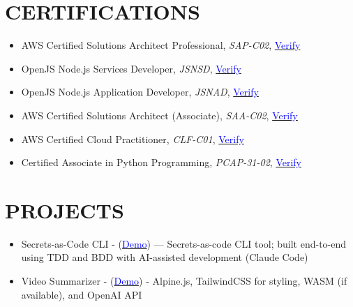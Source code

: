 \documentclass[margin]{res}
\begin{document}
\begin{resume}
	\section{\textcolor{NavyBlue}{CERTIFICATIONS}}
	\begin{itemize} %
		\item AWS Certified Solutions Architect Professional, \textit{SAP-C02},
		      \href{https://www.youracclaim.com/badges/6768bef0-a7c0-42a6-9b36-6e13351250be}{\textcolor{blue}{Verify}}

		\item OpenJS Node.js Services Developer, \textit{JSNSD},
					\href{https://www.youracclaim.com/badges/d17570bd-2145-4cc2-9645-673fc3f6947e}{\textcolor{blue}{Verify}}

		\item OpenJS Node.js Application Developer, \textit{JSNAD},
		      \href{https://www.youracclaim.com/badges/76bcd62c-af5b-4957-b9ef-533403369d8d}{\textcolor{blue}{Verify}}

		\item AWS Certified Solutions Architect (Associate), \textit{SAA-C02},
		      \href{https://www.youracclaim.com/badges/4b572dd0-85e9-45f5-90f8-90a68cd3399f}{\textcolor{blue}{Verify}}

		\item AWS Certified Cloud Practitioner, \textit{CLF-C01},
		      \href{https://www.youracclaim.com/badges/48063b2f-6f7f-4b6c-a040-5c42393c4bc0}{\textcolor{blue}{Verify}}


		\item Certified Associate in Python Programming, \textit{PCAP-31-02},
		      \href{https://www.youracclaim.com/badges/bfd6aae6-1ab4-461b-8a62-f25cfb0bd29d}{\textcolor{blue}{Verify}}

	\end{itemize}

	\section{\textcolor{NavyBlue}{PROJECTS}}
	\begin{itemize}
		\item Secrets-as-Code CLI - (\href{https://clef.sh}{\textcolor{blue}{Demo}}) — Secrets-as-code CLI tool; built end-to-end using TDD and BDD with AI-assisted development (Claude Code)

		\item Video Summarizer - (\href{https://video-summarizer.pages.dev/}{\textcolor{blue}{Demo}}) - Alpine.js, TailwindCSS
		for styling, WASM (if available), and OpenAI API
	\end{itemize}


\end{resume}
\end{document}
